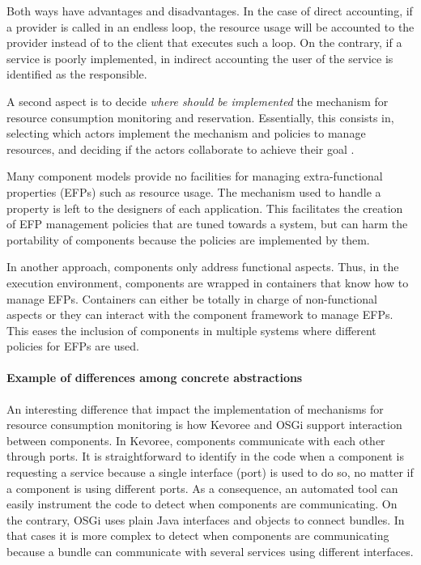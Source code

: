 Both ways have advantages and disadvantages.
In the case of direct accounting, if a provider is
called in an endless loop, the resource usage will be accounted
to the provider instead of to the client that executes such a loop.
On the contrary, if a service is poorly implemented, in indirect accounting the user of the service is identified as the responsible.

A second aspect is to decide \textit{where should be implemented} the mechanism for resource consumption monitoring and reservation.
Essentially, this consists in, selecting which actors implement the mechanism and policies to manage resources, and deciding if the actors collaborate to achieve their goal \cite{Crnkovic2011}.

Many component models provide no facilities for managing extra-functional properties (EFPs) such as resource usage.
The mechanism used to handle a property is left to the designers of each application.
This facilitates the creation of EFP management policies that are tuned towards a system, but can harm the portability of components because the policies are implemented by them.

In another approach, components only address functional aspects.
Thus, in the execution environment, components
are wrapped in containers that know how to manage EFPs.
Containers can either be totally in charge of non-functional aspects or
they can interact with the component framework to manage EFPs.
This eases the inclusion of components in multiple systems where different policies for EFPs are used.

\paragraph{Example of differences among concrete abstractions}

An interesting difference that impact the implementation of mechanisms for resource consumption monitoring is how Kevoree and OSGi support interaction between components.
In Kevoree, components communicate with each other through ports.
It is straightforward to identify in the code when a component is requesting a service because a single interface (port) is used to do so, no matter if a component is using different ports. 
As a consequence, an automated tool can easily instrument the code to detect when components are communicating.
On the contrary, OSGi uses plain Java interfaces and objects to connect bundles.
In that cases it is more complex to detect when components are communicating because a bundle can communicate with several services using different interfaces. 

